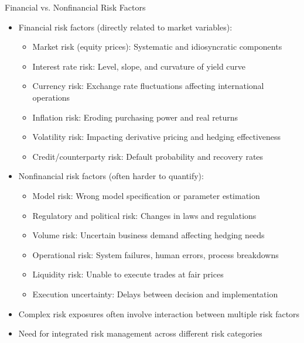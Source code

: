 \documentclass[10pt]{beamer}
\begin{document}
\begin{frame}{Financial vs. Nonfinancial Risk Factors}
  \begin{itemize}[<+->]
    \item Financial risk factors (directly related to market variables):
      \begin{itemize}
        \item Market risk (equity prices): Systematic and idiosyncratic components
        \item Interest rate risk: Level, slope, and curvature of yield curve
        \item Currency risk: Exchange rate fluctuations affecting international operations
        \item Inflation risk: Eroding purchasing power and real returns
        \item Volatility risk: Impacting derivative pricing and hedging effectiveness
        \item Credit/counterparty risk: Default probability and recovery rates
      \end{itemize}
      
    \item Nonfinancial risk factors (often harder to quantify):
      \begin{itemize}
        \item Model risk: Wrong model specification or parameter estimation
        \item Regulatory and political risk: Changes in laws and regulations
        \item Volume risk: Uncertain business demand affecting hedging needs
        \item Operational risk: System failures, human errors, process breakdowns
        \item Liquidity risk: Unable to execute trades at fair prices
        \item Execution uncertainty: Delays between decision and implementation
      \end{itemize}
      
    \item Complex risk exposures often involve interaction between multiple risk factors
    \item Need for integrated risk management across different risk categories
  \end{itemize}
\end{frame}
\end{document}
